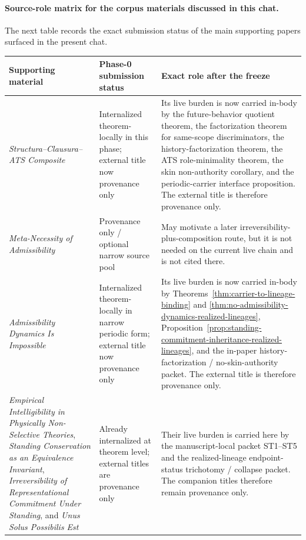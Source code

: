 \paragraph{Source-role matrix for the corpus materials discussed in this chat.}
The next table records the exact submission status of the main supporting papers surfaced in the present chat.

\begin{center}
\footnotesize
\renewcommand{\arraystretch}{1.16}
\setlength{\tabcolsep}{4pt}
\begin{tabularx}{0.98\textwidth}{@{}L{0.32\textwidth}L{0.22\textwidth}Y@{}}
\toprule
\textbf{Supporting material} & \textbf{Phase-0 submission status} & \textbf{Exact role after the freeze}\\
\midrule
\emph{Structura--Clausura--ATS Composite} & Internalized theorem-locally in this phase; external title now provenance only & Its live burden is now carried in-body by the future-behavior quotient theorem, the factorization theorem for same-scope discriminators, the history-factorization theorem, the ATS role-minimality theorem, the skin non-authority corollary, and the periodic-carrier interface proposition. The external title is therefore provenance only.\\
\emph{Meta-Necessity of Admissibility} & Provenance only / optional narrow source pool & May motivate a later irreversibility-plus-composition route, but it is not needed on the current live chain and is not cited there.\\
\emph{Admissibility Dynamics Is Impossible} & Internalized theorem-locally in narrow periodic form; external title now provenance only & Its live burden is now carried in-body by Theorems~\ref{thm:carrier-to-lineage-binding} and \ref{thm:no-admissibility-dynamics-realized-lineages}, Proposition~\ref{prop:standing-commitment-inheritance-realized-lineages}, and the in-paper history-factorization / no-skin-authority packet. The external title is therefore provenance only.\\
\emph{Empirical Intelligibility in Physically Non-Selective Theories}, \emph{Standing Conservation as an Equivalence Invariant}, \emph{Irreversibility of Representational Commitment Under Standing}, and \emph{Unus Solus Possibilis Est} & Already internalized at theorem level; external titles are provenance only & Their live burden is carried here by the manuscript-local packet ST1--ST5 and the realized-lineage endpoint-status trichotomy / collapse packet. The companion titles therefore remain provenance only.\\

\end{tabularx}
\end{center}

